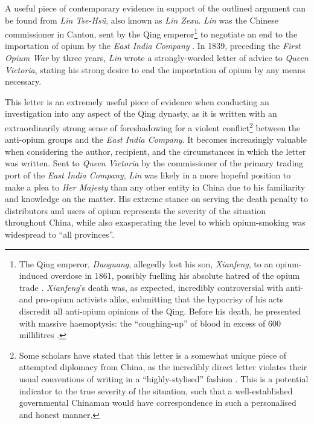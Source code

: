 \documentclass[a4paper,oneside]{article}
\begin{document}
        A useful piece of contemporary evidence in support of the outlined argument can be found from \textit{Lin Tse-Hs\"u}, also known as \textit{Lin Zexu}. \textit{Lin} was the Chinese commissioner in Canton, sent by the Qing emperor\footnote{The Qing emperor, \textit{Daoguang}, allegedly lost his son, \textit{Xianfeng}, to an opium-induced overdose in 1861, possibly fuelling his absolute hatred of the opium trade \autocite{Ringmar:2013}. \textit{Xianfeng}'s death was, as expected, incredibly controversial with anti- and pro-opium activists alike, submitting that the hypocrisy of his acts discredit all anti-opium opinions of the Qing. Before his death, he presented with massive haemoptysis: the ``coughing-up'' of blood in excess of 600 millilitres \autocite{Sabatine:2013}.} to negotiate an end to the importation of opium by the \textit{East India Company} \autocite{ChinaHistoricalArchives:1992}. In 1839, preceding the \textit{First Opium War} by three years, \textit{Lin} wrote a strongly-worded letter of advice to \textit{Queen Victoria}, stating his strong desire to end the importation of opium by any means necessary.


        This letter is an extremely useful piece of evidence when conducting an investigation into any aspect of the Qing dynasty, as it is written with an extraordinarily strong sense of foreshadowing for a violent conflict\footnote{Some scholars have stated that this letter is a somewhat unique piece of attempted diplomacy from China, as the incredibly direct letter violates their usual conventions of writing in a ``highly-stylised'' fashion \autocite{Kishlansky:1995}. This is a potential indicator to the true severity of the situation, such that a well-established governmental Chinaman would have correspondence in such a personalised and honest manner.} between the anti-opium groups and the \textit{East India Company}. It becomes increasingly valuable when considering the author, recipient, and the circumstances in which the letter was written. Sent to \textit{Queen Victoria} by the commissioner of the primary trading port of the \textit{East India Company}, \textit{Lin} was likely in a more hopeful position to make a plea to \textit{Her Majesty} than any other entity in China due to his familiarity and knowledge on the matter. His extreme stance on serving the death penalty to distributors and users of opium represents the severity of the situation throughout China, while also exasperating the level to which opium-smoking was widespread to ``all provinces''.
\end{document}
